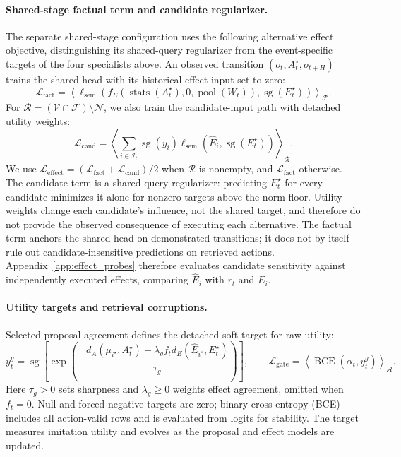 \paragraph{Shared-stage factual term and candidate regularizer.}
The separate shared-stage configuration uses the following alternative effect objective, distinguishing its shared-query regularizer from the event-specific targets of the four specialists above.
An observed transition $(o_t,A_t^\star,o_{t+H})$ trains the shared head with its historical-effect input set to zero:
\begin{equation}
 \mathcal L_{\mathrm{fact}}=\left\langle
 \ell_{\mathrm{sem}}\!\left(f_E(\operatorname{stats}(A_t^\star),0,
 \operatorname{pool}(W_t)),\operatorname{sg}(E_t^\star)\right)
 \right\rangle_{\mathcal F}.
 \label{eq:factual_effect_loss}
\end{equation}
For $\mathcal R=(\mathcal V\cap\mathcal F)\setminus\mathcal N$, we also train the candidate-input path with detached utility weights:
\begin{equation}
 \mathcal L_{\mathrm{cand}}=\left\langle\sum_{i\in\mathcal I_t}
 \operatorname{sg}(y_i)\ell_{\mathrm{sem}}(\widehat E_i,\operatorname{sg}(E_t^\star))
 \right\rangle_{\mathcal R}.
 \label{eq:candidate_regularizer}
\end{equation}
We use $\mathcal L_{\mathrm{effect}}=(\mathcal L_{\mathrm{fact}}+\mathcal L_{\mathrm{cand}})/2$ when $\mathcal R$ is nonempty, and $\mathcal L_{\mathrm{fact}}$ otherwise.
The candidate term is a shared-query regularizer: predicting $E_t^\star$ for every candidate minimizes it alone for nonzero targets above the norm floor.
Utility weights change each candidate's influence, not the shared target, and therefore do not provide the observed consequence of executing each alternative.
The factual term anchors the shared head on demonstrated transitions; it does not by itself rule out candidate-insensitive predictions on retrieved actions.
Appendix~\ref{app:effect_probes} therefore evaluates candidate sensitivity against independently executed effects, comparing $\widehat E_i$ with $r_t$ and $E_i$.

\paragraph{Utility targets and retrieval corruptions.}
Selected-proposal agreement defines the detached soft target for raw utility:
\begin{equation}
 y_t^g=\operatorname{sg}\!\left[\exp\!\left(-
 \frac{d_A(\mu_{i^\star},A_t^\star)+\lambda_g f_t d_E(\widehat E_{i^\star},E_t^\star)}{\tau_g}
 \right)\right],\qquad
 \mathcal L_{\mathrm{gate}}=\left\langle\operatorname{BCE}(\alpha_t,y_t^g)\right\rangle_{\mathcal A}.
 \label{eq:gate_loss}
\end{equation}
Here $\tau_g>0$ sets sharpness and $\lambda_g\geq0$ weights effect agreement, omitted when $f_t=0$.
Null and forced-negative targets are zero; binary cross-entropy (BCE) includes all action-valid rows and is evaluated from logits for stability.
The target measures imitation utility and evolves as the proposal and effect models are updated.

